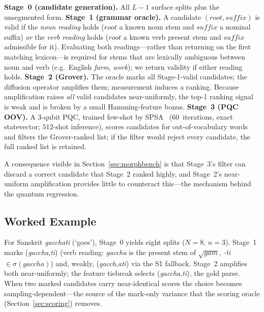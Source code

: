 \documentclass[journal]{IEEEtran}
\begin{document}
\textbf{Stage~0 (candidate generation).} All $L\!-\!1$ surface splits plus the
unsegmented form.
\textbf{Stage~1 (grammar oracle).} A candidate $(root,suffix)$ is valid if the
\emph{noun reading} holds ($root$ a known noun stem and $suffix$ a nominal
suffix) \emph{or} the \emph{verb reading} holds ($root$ a known verb present
stem and $suffix$ admissible for it). Evaluating both readings---rather than
returning on the first matching lexicon---is required for stems that are
lexically ambiguous between noun and verb (e.g.\ English \emph{farm},
\emph{work}); we return validity if either reading holds.
\textbf{Stage~2 (Grover).} The oracle marks all Stage-1-valid candidates; the
diffusion operator amplifies them; measurement induces a ranking. Because
amplification raises \emph{all} valid candidates near-uniformly, the top-1
ranking signal is weak and is broken by a small Hamming-feature bonus.
\textbf{Stage~3 (PQC OOV).} A 3-qubit PQC, trained few-shot by SPSA~\cite{spall1992}
(60~iterations, exact statevector; $512$-shot inference), scores candidates for
out-of-vocabulary words and filters the Grover-ranked list; if the filter would
reject every candidate, the full ranked list is retained.

A consequence visible in Section~\ref{sec:morphbench} is that Stage~3's filter
can discard a correct candidate that Stage~2 ranked highly, and Stage~2's
near-uniform amplification provides little to counteract this---the mechanism
behind the quantum regression.



\subsection{Worked Example}
\label{sec:worked}
For Sanskrit \emph{gacchati} (`goes'), Stage~0 yields eight splits ($N{=}8$,
$n{=}3$). Stage~1 marks (\emph{gaccha},\emph{ti}) (verb reading: \emph{gaccha} is
the present stem of $\sqrt{gam}$, \emph{-ti}$\in\sigma(gaccha)$) and, weakly,
(\emph{gacch},\emph{ati}) via the S1 fallback. Stage~2 amplifies both
near-uniformly; the feature tiebreak selects (\emph{gaccha},\emph{ti}), the gold
parse. When two marked candidates carry near-identical scores the choice becomes
sampling-dependent---the source of the mark-only variance that the scoring oracle
(Section~\ref{sec:scoring}) removes.
\end{document}

